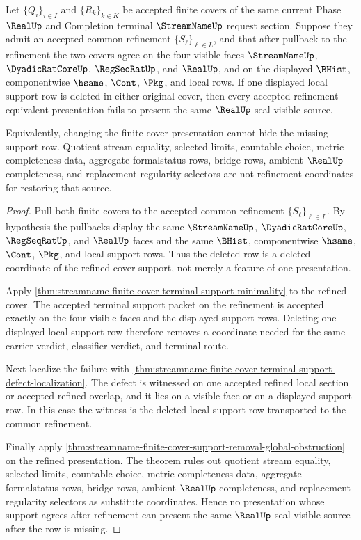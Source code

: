 \begin{theorem}
\label{thm:streamname-finite-cover-support-invariance-under-refinement}
Let $\{Q_i\}_{i \in I}$ and $\{R_k\}_{k \in K}$ be accepted finite covers of
the same current Phase $\RealUp$ and Completion terminal $\StreamNameUp$
request section. Suppose they admit an accepted common refinement
$\{S_\ell\}_{\ell \in L}$, and that after pullback to the refinement the two
covers agree on the four visible faces $\StreamNameUp$, $\DyadicRatCoreUp$,
$\RegSeqRatUp$, and $\RealUp$, and on the displayed $\BHist$, componentwise
$\hsame$, $\Cont$, $\Pkg$, and local \NameCert{} rows. If one displayed local
support row is deleted in either original cover, then every accepted
refinement-equivalent presentation fails to present the same $\RealUp$
seal-visible source.

Equivalently, changing the finite-cover presentation cannot hide the missing
support row. Quotient stream equality, selected limits, countable choice,
metric-completeness data, aggregate formalstatus rows, bridge rows, ambient
$\RealUp$ completeness, and replacement regularity selectors are not
refinement coordinates for restoring that source.
\end{theorem}
\begin{proof}
Pull both finite covers to the accepted common refinement
$\{S_\ell\}_{\ell \in L}$. By hypothesis the pullbacks display the same
$\StreamNameUp$, $\DyadicRatCoreUp$, $\RegSeqRatUp$, and $\RealUp$ faces and
the same $\BHist$, componentwise $\hsame$, $\Cont$, $\Pkg$, and local
\NameCert{} support rows. Thus the deleted row is a deleted coordinate of the
refined cover support, not merely a feature of one presentation.

Apply
\autoref{thm:streamname-finite-cover-terminal-support-minimality} to the
refined cover. The accepted terminal support packet on the refinement is
accepted exactly on the four visible faces and the displayed support rows.
Deleting one displayed local support row therefore removes a coordinate needed
for the same carrier verdict, classifier verdict, and terminal route.

Next localize the failure with
\autoref{thm:streamname-finite-cover-terminal-support-defect-localization}.
The defect is witnessed on one accepted refined local section or accepted
refined overlap, and it lies on a visible face or on a displayed support row.
In this case the witness is the deleted local support row transported to the
common refinement.

Finally apply
\autoref{thm:streamname-finite-cover-support-removal-global-obstruction} on
the refined presentation. The theorem rules out quotient stream equality,
selected limits, countable choice, metric-completeness data, aggregate
formalstatus rows, bridge rows, ambient $\RealUp$ completeness, and replacement
regularity selectors as substitute coordinates. Hence no presentation whose
support agrees after refinement can present the same $\RealUp$
seal-visible source after the row is missing.
\end{proof}

